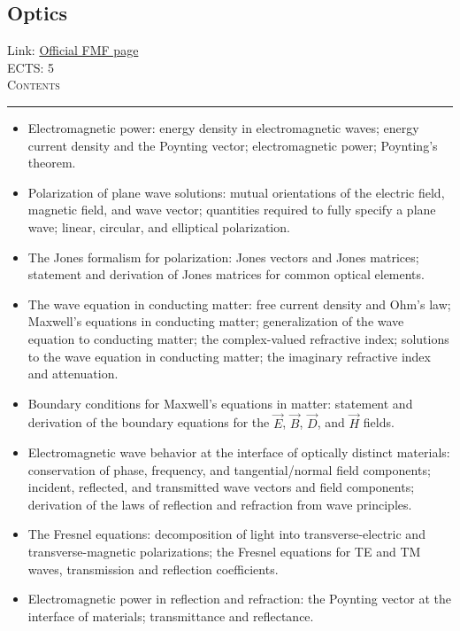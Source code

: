 \documentclass[11pt, a4paper]{article}
\newenvironment{course}[3]{
\subsection{#1}%
Link: \href{#2}{Official FMF page}\\%
ECTS: #3%
\vspace{1ex}
\\
{\large \textsc{Contents}}\\[-0.9ex]%
\rule{\textwidth}{0.5pt}
\vspace{-3ex}
}
{}
\newenvironment{chapter}[1]{
\begin{tcolorbox}[title=#1, breakable]
}
{\end{tcolorbox}}
\begin{document}
\begin{course}{Optics}{https://www.fmf.uni-lj.si/en/study-physics/programmes/1fiz/2020/7000777/courses/1165/}{5}
\begin{chapter}{Fundamentals of wave optics}
\begin{itemize}
            \item Electromagnetic power: energy density in electromagnetic waves; energy current density and the Poynting vector; electromagnetic power; Poynting's theorem.

            \item Polarization of plane wave solutions: mutual orientations of the electric field, magnetic field, and wave vector; quantities required to fully specify a plane wave; linear, circular, and elliptical polarization.

            \item The Jones formalism for polarization: Jones vectors and Jones matrices; statement and derivation of Jones matrices for common optical elements.

            \item The wave equation in conducting matter: free current density and Ohm's law; Maxwell's equations in conducting matter; generalization of the wave equation to conducting matter; the complex-valued refractive index; solutions to the wave equation in conducting matter; the imaginary refractive index and attenuation.
        
        \end{itemize}
    \end{chapter}

    \begin{chapter}{Reflection and refraction}
        \begin{itemize}
        
            \item Boundary conditions for Maxwell's equations in matter: statement and derivation of the boundary equations for the $ \vec{E} $, $ \vec{B} $, $ \vec{D} $, and $ \vec{H} $ fields.

            \item Electromagnetic wave behavior at the interface of optically distinct materials: conservation of phase, frequency, and tangential/normal field components; incident, reflected, and transmitted wave vectors and field components; derivation of the laws of reflection and refraction from wave principles.

            \item The Fresnel equations: decomposition of light into transverse-electric and transverse-magnetic polarizations; the Fresnel equations for TE and TM waves, transmission and reflection coefficients.

            \item Electromagnetic power in reflection and refraction: the Poynting vector at the interface of materials; transmittance and reflectance.


\end{itemize}
\end{chapter}
\end{course}
\end{document}
